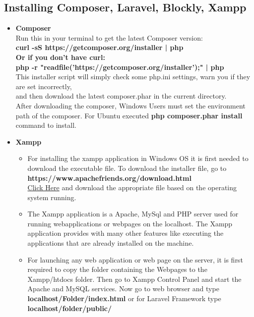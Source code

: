 \documentclass[a4paper,12pt,oneside]{book}
\begin{document}
\begin{itemize}
  \subsection{Installing Composer, Laravel, Blockly, Xampp}
  \begin{itemize}
      \item \textbf{Composer}\\
      Run this in your terminal to get the latest Composer version:\\
	\textbf{curl -sS https://getcomposer.org/installer | php\\
      Or if you don't have curl:}\\
	 \textbf{php -r "readfile('https://getcomposer.org/installer');" | php}\\
      This installer script will simply check some php.ini settings, warn you if they are set incorrectly,\\
      and then download the latest composer.phar in the current directory.\\      
      After downloading the composer, Windows Users must set the environment path of the composer.
      For Ubuntu executed \textbf{php composer.phar install} command to install.
      \newpage
      \item \textbf{Xampp}\\
      \begin{itemize}
      \item 
      For installing the xampp application in Windows OS it is first needed to download the executable file.
      To download the installer file, go to\\ \textbf{https://www.apachefriends.org/download.html}\\\href{https://www.apachefriends.org/download.html}{Click Here}
      and download the appropriate file based on the operating system running. 
      \item
      The Xampp application is a Apache, MySql and PHP server used for running webapplications or webpages on the 
      localhost. The Xampp application provides with many other features like executing the applications that are already
      installed on the machine. 
      \item
      For launching any web application or web page on the server, it is first required to copy the folder containing the Webpages to the Xampp/htdocs folder. Then go to Xampp Control Panel and start the Apache and MySQL services. Now go to web browser and type\\\textbf{localhost/Folder/index.html} or for Laravel Framework type\\ \textbf{localhost/folder/public/}

\end{itemize}
\end{itemize}
\end{itemize}
\end{document}
